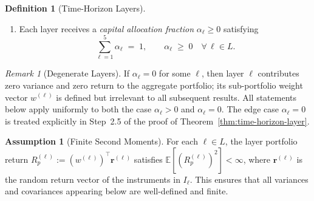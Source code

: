 \documentclass[12pt,openany]{book}
\newcommand{\bfw}{\mathbf{w}}
\numberwithin{equation}{chapter}
\theoremstyle{plain}
\theoremstyle{definition}
\newtheorem{definition}[theorem]{Definition}
\newtheorem{assumption}[theorem]{Assumption}
\theoremstyle{remark}
\newtheorem{remark}[theorem]{Remark}
\def\mathcal#1{#1}%
\def\bfw{w}%
\begin{document}
\begin{definition}[Time-Horizon Layers]
\begin{enumerate}
        $B_\ell \in (0,1)$ satisfying
        \begin{equation}
          \sum_{\ell=1}^{5} B_\ell \;=\; 1.
          \label{eq:budget-sum}
        \end{equation}
  \item Each layer receives a \emph{capital allocation fraction}
        $\alpha_\ell \geq 0$ satisfying
        \begin{equation}
          \sum_{\ell=1}^{5} \alpha_\ell \;=\; 1,
          \qquad \alpha_\ell \;\geq\; 0
          \quad \forall\, \ell \in \mathcal{L}.
          \label{eq:alpha-sum}
        \end{equation}
\end{enumerate}
\end{definition}

\begin{remark}[Degenerate Layers]
\label{rem:degenerate-layer}
If $\alpha_\ell = 0$ for some $\ell$, then layer $\ell$ contributes
zero variance and zero return to the aggregate portfolio; its
sub-portfolio weight vector $\bfw^{(\ell)}$ is defined but
irrelevant to all subsequent results.  All statements below apply
uniformly to both the case $\alpha_\ell > 0$ and
$\alpha_\ell = 0$.  The edge case $\alpha_\ell = 0$ is treated
explicitly in Step~2.5 of the proof of
Theorem~\ref{thm:time-horizon-layer}.
\end{remark}

\begin{assumption}[Finite Second Moments]
\label{asm:second-moments}
For each $\ell \in \mathcal{L}$, the layer portfolio return
$R_p^{(\ell)} := (\bfw^{(\ell)})^\top \mathbf{r}^{(\ell)}$
satisfies $\mathbb{E}[(R_p^{(\ell)})^2] < \infty$, where
$\mathbf{r}^{(\ell)}$ is the random return vector of the
instruments in $\mathcal{I}_\ell$.  This ensures that all variances
and covariances appearing below are well-defined and finite.
\end{assumption}
\end{document}
